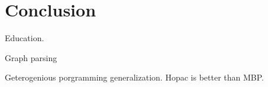 \section{Conclusion}

Education.

Graph parsing

Geterogenious porgramming generalization. Hopac is better than MBP.

